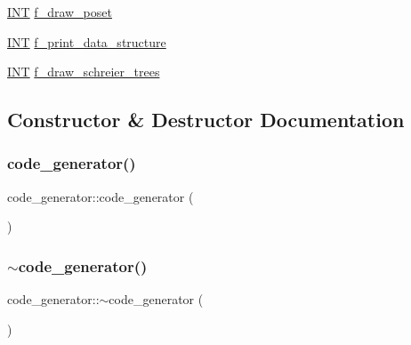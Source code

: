 \begin{DoxyCompactItemize}
\item 
\mbox{\hyperlink{galois_8h_a09fddde158a3a20bd2dcadb609de11dc}{I\+NT}} \mbox{\hyperlink{classcode__generator_a644b0df49347ffc20d6fb06d6e5c6a89}{f\+\_\+draw\+\_\+poset}}
\item 
\mbox{\hyperlink{galois_8h_a09fddde158a3a20bd2dcadb609de11dc}{I\+NT}} \mbox{\hyperlink{classcode__generator_af187fa722433cc58cadf0de0701addab}{f\+\_\+print\+\_\+data\+\_\+structure}}
\item 
\mbox{\hyperlink{galois_8h_a09fddde158a3a20bd2dcadb609de11dc}{I\+NT}} \mbox{\hyperlink{classcode__generator_aae28e84405dc2d18384560c2eaa6b368}{f\+\_\+draw\+\_\+schreier\+\_\+trees}}
\end{DoxyCompactItemize}


\subsection{Constructor \& Destructor Documentation}
\mbox{\label{classcode__generator_a1218452973234e90972be154fc25bf92}} 
\subsubsection{\texorpdfstring{code\+\_\+generator()}{code\_generator()}}
{\footnotesize\ttfamily code\+\_\+generator\+::code\+\_\+generator (\begin{DoxyParamCaption}{ }\end{DoxyParamCaption})}

\mbox{\label{classcode__generator_a5a6ebae74ab6d7180e7ebb280336e7f7}} 
\subsubsection{\texorpdfstring{$\sim$code\+\_\+generator()}{~code\_generator()}}
{\footnotesize\ttfamily code\+\_\+generator\+::$\sim$code\+\_\+generator (\begin{DoxyParamCaption}{ }\end{DoxyParamCaption})}



